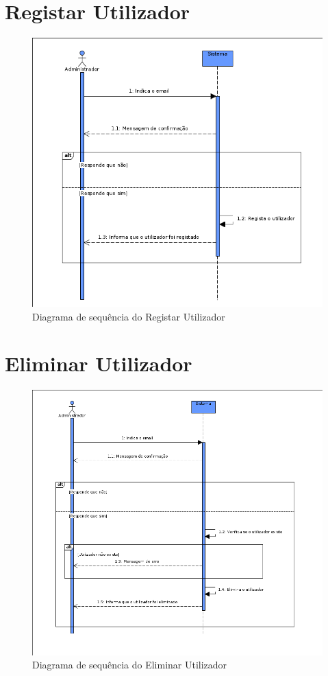\documentclass[a4paper]{report}
\begin{document}
\section{Registar Utilizador}

\begin{figure}[H]
	\centering 
    \includegraphics[width=\textwidth]{images/reguserSeq.png}  
    \caption{Diagrama de sequência do Registar Utilizador}
\end{figure}

\section{Eliminar Utilizador}

\begin{figure}[H]
	\centering 
    \includegraphics[width=\textwidth]{images/elemuserSeq.png}  
    \caption{Diagrama de sequência do Eliminar Utilizador}
\end{figure}
\end{document}

